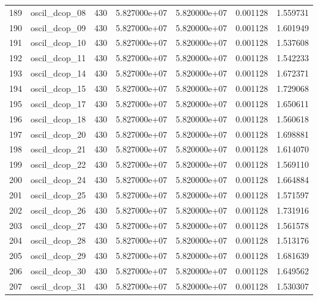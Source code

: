 \begin{tabular}{llrrrrr}
189 &            oscil\_dcop\_08 &   430 &  5.827000e+07 &  5.820000e+07 &  0.001128 &   1.559731 \\
190 &            oscil\_dcop\_09 &   430 &  5.827000e+07 &  5.820000e+07 &  0.001128 &   1.601949 \\
191 &            oscil\_dcop\_10 &   430 &  5.827000e+07 &  5.820000e+07 &  0.001128 &   1.537608 \\
192 &            oscil\_dcop\_11 &   430 &  5.827000e+07 &  5.820000e+07 &  0.001128 &   1.542233 \\
193 &            oscil\_dcop\_14 &   430 &  5.827000e+07 &  5.820000e+07 &  0.001128 &   1.672371 \\
194 &            oscil\_dcop\_15 &   430 &  5.827000e+07 &  5.820000e+07 &  0.001128 &   1.729068 \\
195 &            oscil\_dcop\_17 &   430 &  5.827000e+07 &  5.820000e+07 &  0.001128 &   1.650611 \\
196 &            oscil\_dcop\_18 &   430 &  5.827000e+07 &  5.820000e+07 &  0.001128 &   1.560618 \\
197 &            oscil\_dcop\_20 &   430 &  5.827000e+07 &  5.820000e+07 &  0.001128 &   1.698881 \\
198 &            oscil\_dcop\_21 &   430 &  5.827000e+07 &  5.820000e+07 &  0.001128 &   1.614070 \\
199 &            oscil\_dcop\_22 &   430 &  5.827000e+07 &  5.820000e+07 &  0.001128 &   1.569110 \\
200 &            oscil\_dcop\_24 &   430 &  5.827000e+07 &  5.820000e+07 &  0.001128 &   1.664884 \\
201 &            oscil\_dcop\_25 &   430 &  5.827000e+07 &  5.820000e+07 &  0.001128 &   1.571597 \\
202 &            oscil\_dcop\_26 &   430 &  5.827000e+07 &  5.820000e+07 &  0.001128 &   1.731916 \\
203 &            oscil\_dcop\_27 &   430 &  5.827000e+07 &  5.820000e+07 &  0.001128 &   1.561578 \\
204 &            oscil\_dcop\_28 &   430 &  5.827000e+07 &  5.820000e+07 &  0.001128 &   1.513176 \\
205 &            oscil\_dcop\_29 &   430 &  5.827000e+07 &  5.820000e+07 &  0.001128 &   1.681639 \\
206 &            oscil\_dcop\_30 &   430 &  5.827000e+07 &  5.820000e+07 &  0.001128 &   1.649562 \\
207 &            oscil\_dcop\_31 &   430 &  5.827000e+07 &  5.820000e+07 &  0.001128 &   1.530307 \\

\end{tabular}
